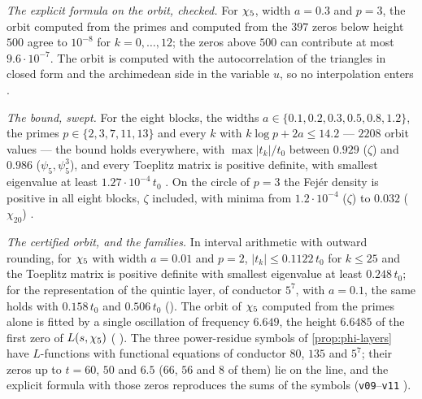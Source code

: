 \emph{The explicit formula on the orbit, checked.}  For $\chi_5$, width $a=0.3$ and $p=3$, the
orbit computed from the primes and computed from the $397$ zeros below height $500$ agree to
$10^{-8}$ for $k=0,\dots,12$; the zeros above $500$ can contribute at most $9.6\cdot10^{-7}$.  The
orbit is computed with the autocorrelation of the triangles in closed form and the
archimedean side in the variable $u$, so no interpolation enters .

\emph{The bound, swept.}  For the eight blocks, the widths $a\in\{0.1,0.2,0.3,0.5,0.8,1.2\}$, the
primes $p\in\{2,3,7,11,13\}$ and every $k$ with $k\log p+2a\le14.2$ --- $2208$ orbit values --- the
bound holds everywhere, with $\max|t_k|/t_0$ between $0.929$ ($\zeta$) and $0.986$ ($\psi_5,\psi_5^3$), and
every Toeplitz matrix is positive definite, with smallest eigenvalue at least $1.27\cdot10^{-4}\,t_0$
.  On the circle of $p=3$ the Fej\'er density is positive in all eight
blocks, $\zeta$ included, with minima from $1.2\cdot10^{-4}$ ($\zeta$) to $0.032$ ($\chi_{20}$)
.

\emph{The certified orbit, and the families.}  In interval arithmetic with outward rounding,
for $\chi_5$ with width $a=0.01$ and $p=2$, $|t_k|\le0.1122\,t_0$ for $k\le25$ and the Toeplitz matrix is
positive definite with smallest eigenvalue at least $0.248\,t_0$; for the representation of the
quintic layer, of conductor $5^7$, with $a=0.1$, the same holds with $0.158\,t_0$ and $0.506\,t_0$
().  The orbit of $\chi_5$ computed from the primes alone is fitted by
a single oscillation of frequency $6.649$, the height $6.6485$ of the first zero of $L(s,\chi_5)$
( ).  The three power-residue symbols of \cref{prop:phi-layers} have $L$-functions with
functional equations of conductor $80$, $135$ and $5^7$; their zeros up to $t=60$, $50$ and $6.5$
($66$, $56$ and $8$ of them) lie on the line, and the explicit formula with those zeros
reproduces the sums of the symbols (\texttt{v09}--\texttt{v11} ).

